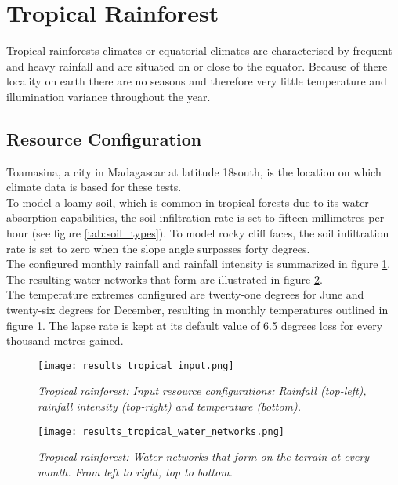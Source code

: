 \section{Tropical Rainforest}

Tropical rainforests climates or equatorial climates are characterised by frequent and heavy rainfall and are situated on or close to the equator. Because of there locality on earth there are no seasons and therefore very little temperature and illumination variance throughout the year.\\

\subsection{Resource Configuration}

Toamasina, a city in Madagascar at latitude 18\textdegree south, is the location on which climate data is based for these tests.\\

To model a loamy soil, which is common in tropical forests due to its water absorption capabilities, the soil infiltration rate is set to fifteen millimetres per hour (see figure \ref{tab:soil_types}). To model rocky cliff faces, the soil infiltration rate is set to zero when the slope angle surpasses forty degrees.\\

The configured monthly rainfall and rainfall intensity is summarized in figure \ref{fig:results_tropical_input}. The resulting water networks that form are illustrated in figure \ref{fig:results_tropical_water_networks}.\\

The temperature extremes configured are twenty-one degrees for June and twenty-six degrees for December, resulting in monthly temperatures outlined in figure \ref{fig:results_tropical_input}. The lapse rate is kept at its default value of 6.5 degrees loss for every thousand metres gained. \\

\begin{figure}
\center
	\texttt{[image: results\_tropical\_input.png]}
	\caption{ \textit{Tropical rainforest: Input resource configurations: Rainfall (top-left), rainfall intensity (top-right) and temperature (bottom).}}
	\label{fig:results_tropical_input}
\end{figure}

\begin{figure}
\center
	\texttt{[image: results\_tropical\_water\_networks.png]}
	\caption{ \textit{Tropical rainforest: Water networks that form on the terrain at every month. From left to right, top to bottom.}}
	\label{fig:results_tropical_water_networks}
\end{figure}

